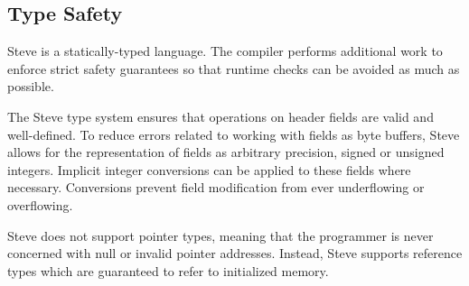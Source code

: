 \subsection{Type Safety}

Steve is a statically-typed language. The compiler performs additional work to
enforce strict safety guarantees so that runtime checks can be avoided as much as possible.

The Steve type system ensures that operations on header fields are valid and
well-defined. 
To reduce errors related to working with fields as byte buffers, Steve allows
for the representation of fields as arbitrary precision, signed or unsigned integers.
Implicit integer conversions can be applied to these fields where necessary.
Conversions prevent field modification from ever underflowing or overflowing.

Steve does not support pointer types, meaning that the programmer is never
concerned with null or invalid pointer addresses. Instead, Steve supports reference
types which are guaranteed to refer to initialized memory.

%
%
%


